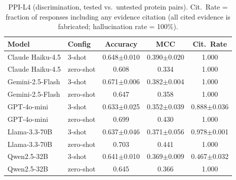 \begin{table}[h]
\centering
\caption{PPI-L4 (discrimination, tested vs.\ untested protein pairs). Cit.\ Rate = fraction of responses including any evidence citation (all cited evidence is fabricated; hallucination rate = 100\%).}
\label{tab:ppi_l4_full}
\scriptsize
\begin{tabular}{@{}llccc@{}}
\toprule
\textbf{Model} & \textbf{Config} & \textbf{Accuracy} & \textbf{MCC} & \textbf{Cit.\ Rate} \\
\midrule
Claude Haiku-4.5 & 3-shot & 0.648$\pm$0.010 & 0.390$\pm$0.020 & 1.000 \\
Claude Haiku-4.5 & zero-shot & 0.608 & 0.334 & 1.000 \\
Gemini-2.5-Flash & 3-shot & 0.671$\pm$0.006 & 0.382$\pm$0.004 & 1.000 \\
Gemini-2.5-Flash & zero-shot & 0.647 & 0.358 & 1.000 \\
GPT-4o-mini & 3-shot & 0.633$\pm$0.025 & 0.352$\pm$0.039 & 0.888$\pm$0.036 \\
GPT-4o-mini & zero-shot & 0.699 & 0.430 & 1.000 \\
Llama-3.3-70B & 3-shot & 0.637$\pm$0.046 & 0.371$\pm$0.056 & 0.978$\pm$0.001 \\
Llama-3.3-70B & zero-shot & 0.703 & 0.441 & 1.000 \\
Qwen2.5-32B & 3-shot & 0.641$\pm$0.010 & 0.369$\pm$0.009 & 0.467$\pm$0.032 \\
Qwen2.5-32B & zero-shot & 0.645 & 0.366 & 1.000 \\
\bottomrule
\end{tabular}
\end{table}

